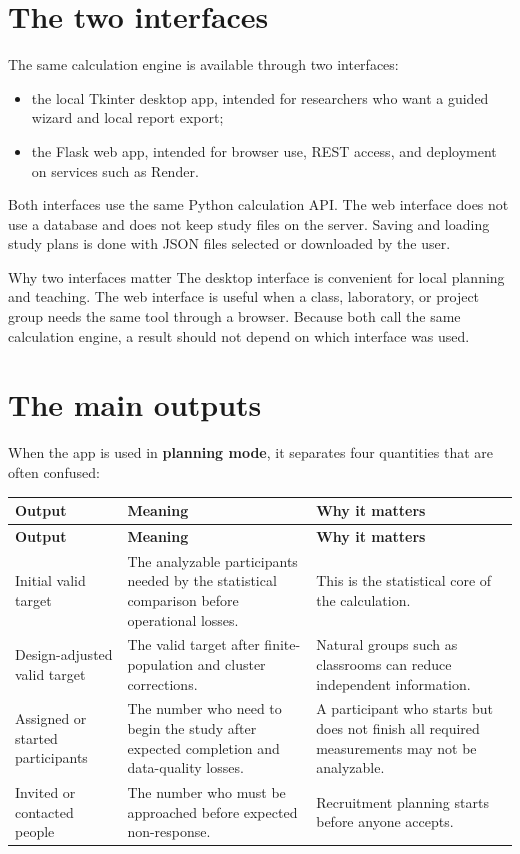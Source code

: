 \documentclass[11pt,a4paper,oneside]{report}
\newcommand{\term}[1]{\textbf{#1}\index{#1}}
\begin{document}
\section{The two interfaces}

The same calculation engine is available through two interfaces:

\begin{itemize}
  \item the local Tkinter desktop app, intended for researchers who want a guided wizard and local report export;
  \item the Flask web app, intended for browser use, REST access, and deployment on services such as Render.
\end{itemize}

Both interfaces use the same Python calculation API. The web interface does not use a database and does not keep study files on the server. Saving and loading study plans is done with JSON files selected or downloaded by the user.

\begin{conceptbox}{Why two interfaces matter}
The desktop interface is convenient for local planning and teaching. The web interface is useful when a class, laboratory, or project group needs the same tool through a browser. Because both call the same calculation engine, a result should not depend on which interface was used.
\end{conceptbox}

\section{The main outputs}

When the app is used in \term{planning mode}, it separates four quantities that are often confused:

\begin{longtable}{L{0.24\textwidth}L{0.34\textwidth}L{0.32\textwidth}}
\toprule
\textbf{Output} & \textbf{Meaning} & \textbf{Why it matters}\\
\midrule
\endfirsthead
\toprule
\textbf{Output} & \textbf{Meaning} & \textbf{Why it matters}\\
\midrule
\endhead
Initial valid target & The analyzable participants needed by the statistical comparison before operational losses. & This is the statistical core of the calculation.\\
Design-adjusted valid target & The valid target after finite-population and cluster corrections. & Natural groups such as classrooms can reduce independent information.\\
Assigned or started participants & The number who need to begin the study after expected completion and data-quality losses. & A participant who starts but does not finish all required measurements may not be analyzable.\\
Invited or contacted people & The number who must be approached before expected non-response. & Recruitment planning starts before anyone accepts.\\
\bottomrule
\end{longtable}
\end{document}
